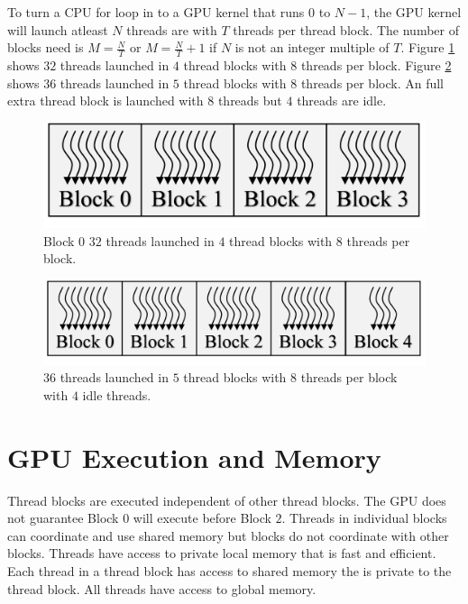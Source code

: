 To turn a CPU for loop in to a GPU kernel that runs $0$ to $N-1$, the GPU kernel will launch atleast $N$ threads are with $T$ threads per thread block.
The number of blocks need is $M = \frac{N}{T}$ or $M = \frac{N}{T}+1$ if $N$ is not an integer multiple of $T$.
Figure \ref{fig:threadsBlocks32} shows $32$ threads launched in $4$ thread blocks with $8$ threads per block.
Figure \ref{fig:threadsBlocks36} shows $36$ threads launched in $5$ thread blocks with $8$ threads per block. 
An full extra thread block is launched with $8$ threads but $4$ threads are idle.
\begin{figure}
	\centering\includegraphics[width=4in/100*55]{figures/gpu_intro/threadsBlocks32.pdf}
	\caption{Block $0$ $32$ threads launched in $4$ thread blocks with $8$ threads per block.}
	\label{fig:threadsBlocks32}
\end{figure}
\begin{figure}
	\centering\includegraphics[width=5in/100*55]{figures/gpu_intro/threadsBlocks36.pdf}
	\caption{$36$ threads launched in $5$ thread blocks with $8$ threads per block with $4$ idle threads.}
	\label{fig:threadsBlocks36}
\end{figure}

\section{GPU Execution and Memory}
\label{sec:GPU_memory}
Thread blocks are executed independent of other thread blocks.
The GPU does not guarantee Block $0$ will execute before Block $2$.
Threads in individual blocks can coordinate and use shared memory but blocks do not coordinate with other blocks.
Threads have access to private local memory that is fast and efficient.
Each thread in a thread block has access to shared memory the is private to the thread block.
All threads have access to global memory.


